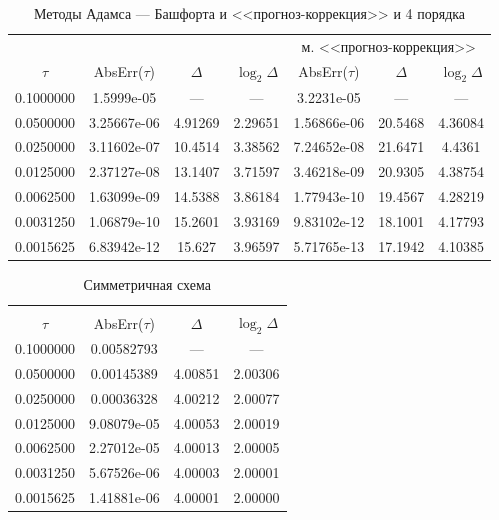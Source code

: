 \documentclass[12pt, a4paper]{article}
\begin{document}
	\begin{table}[H]
		\caption{Методы Адамса --- Башфорта и <<прогноз-коррекция>> и 4 порядка}
		\centering
		\begin{tabular}{|c|c|c|c||c|c|c|}\hline
			& \multicolumn{3}{c||}{\makecell{м. Адамса --- Башфорта}} & \multicolumn{3}{c|}{м. <<прогноз-коррекция>>} \\\cline{2-7}
			$\tau$ & AbsErr($\tau$) & $\Delta$ & $\log_2 \Delta$ & AbsErr($\tau$) & $\Delta$ & $\log_2 \Delta$ \\ \hline
			0.1000000 & 1.5999e-05  &   ---   & ---     & 3.2231e-05  &     --- &   ---   \\ \hline
			0.0500000 & 3.25667e-06 & 4.91269 & 2.29651 & 1.56866e-06 & 20.5468 & 4.36084 \\ \hline
			0.0250000 & 3.11602e-07 & 10.4514 & 3.38562 & 7.24652e-08 & 21.6471 & 4.4361  \\ \hline
			0.0125000 & 2.37127e-08 & 13.1407 & 3.71597 & 3.46218e-09 & 20.9305 & 4.38754 \\ \hline
			0.0062500 & 1.63099e-09 & 14.5388 & 3.86184 & 1.77943e-10 & 19.4567 & 4.28219 \\ \hline
			0.0031250 & 1.06879e-10 & 15.2601 & 3.93169 & 9.83102e-12 & 18.1001 & 4.17793 \\ \hline
			0.0015625 & 6.83942e-12 & 15.627  & 3.96597 & 5.71765e-13 & 17.1942 & 4.10385 \\ \hline
		\end{tabular}
	\end{table}
	
	\begin{table}[H]
		\caption{Симметричная схема}
		\centering
		\begin{tabular}{|c|c|c|c|}
			\hline
			& \multicolumn{3}{c|}{\makecell{Симметричная схема}}\\ \cline{2-4}
			$\tau$   & AbsErr($\tau$) & $\Delta$ &    $\log_2 \Delta$    \\ \hline
			0.1000000 &  0.00582793    &   ---    &          ---          \\ \hline
			0.0500000 &  0.00145389    & 4.00851  &        2.00306        \\ \hline
			0.0250000 &  0.00036328    & 4.00212  &        2.00077        \\ \hline
			0.0125000 &  9.08079e-05   & 4.00053  &        2.00019        \\ \hline
			0.0062500 &  2.27012e-05   & 4.00013  &        2.00005        \\ \hline
			0.0031250 &  5.67526e-06   & 4.00003  &        2.00001        \\ \hline
			0.0015625 &  1.41881e-06   & 4.00001  &        2.00000        \\ \hline
		\end{tabular}
	\end{table}
	
\end{document}

